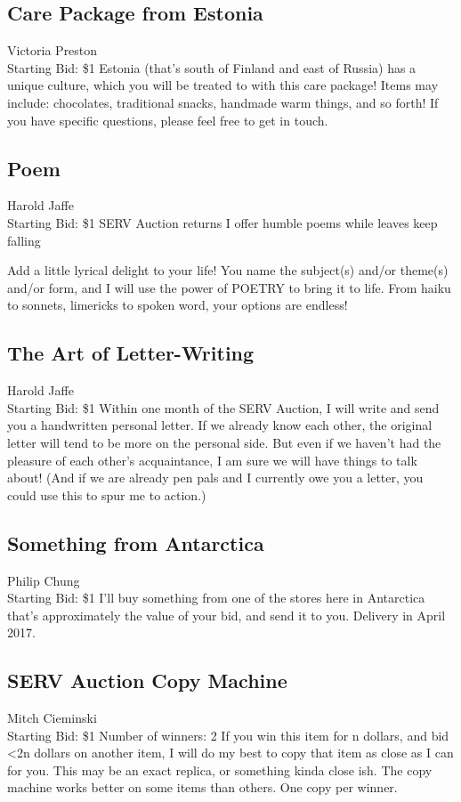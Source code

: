 \documentclass[11pt]{article}
\begin{document}
\subsection{Care Package from Estonia}
Victoria Preston
\\
Starting Bid: \$1
\newline
Estonia (that's south of Finland and east of Russia) has a unique culture, which you will be treated to with this care package! Items may include: chocolates, traditional snacks, handmade warm things, and so forth! If you have specific questions, please feel free to get in touch.
\subsection{Poem}
Harold Jaffe
\\
Starting Bid: \$1
\newline
SERV Auction returns
I offer humble poems
while leaves keep falling

Add a little lyrical delight to your life! You name the subject(s) and/or theme(s) and/or form, and I will use the power of POETRY to bring it to life. From haiku to sonnets, limericks to spoken word, your options are endless!
\subsection{The Art of Letter-Writing}
Harold Jaffe
\\
Starting Bid: \$1
\newline
Within one month of the SERV Auction, I will write and send you a handwritten personal letter. If we already know each other, the original letter will tend to be more on the personal side. But even if we haven't had the pleasure of each other's acquaintance, I am sure we will have things to talk about! (And if we are already pen pals and I currently owe you a letter, you could use this to spur me to action.)
\subsection{Something from Antarctica}
Philip Chung
\\
Starting Bid: \$1
\newline
I'll buy something from one of the stores here in Antarctica that's approximately the value of your bid, and send it to you. Delivery in April 2017.
\subsection{SERV Auction Copy Machine}
Mitch Cieminski
\\
Starting Bid: \$1
\newline
Number of winners: 2
\newline
If you win this item for n dollars, and bid \textless 2n dollars on another item, I will do my best to copy that item as close as I can for you. This may be an exact replica, or something kinda close ish. The copy machine works better on some items than others. One copy per winner.
\end{document}
